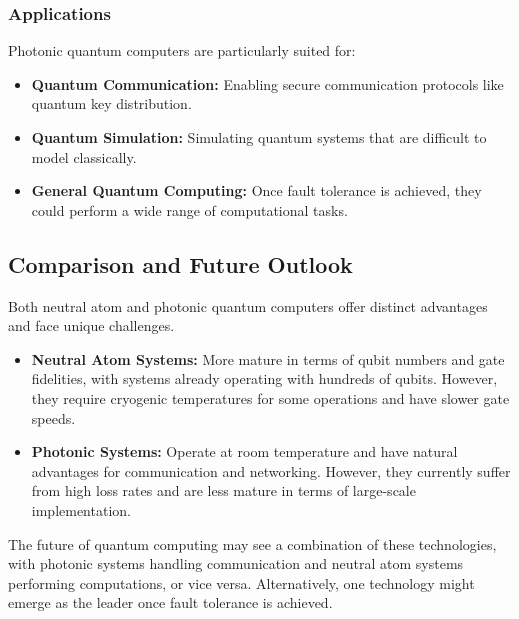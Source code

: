 \subsubsection*{Applications}

Photonic quantum computers are particularly suited for:

\begin{itemize}
  \item \textbf{Quantum Communication:} Enabling secure communication
    protocols like quantum key distribution.
  \item \textbf{Quantum Simulation:} Simulating quantum systems that are
    difficult to model classically.
  \item \textbf{General Quantum Computing:} Once fault tolerance is achieved,
    they could perform a wide range of computational tasks.
\end{itemize}



\subsection*{Comparison and Future Outlook}

Both neutral atom and photonic quantum computers offer distinct advantages
and face unique challenges.

\begin{itemize}
  \item \textbf{Neutral Atom Systems:} More mature in terms of qubit numbers
    and gate fidelities, with systems already operating with hundreds of
    qubits. However, they require cryogenic temperatures for some operations
    and have slower gate speeds.
  \item \textbf{Photonic Systems:} Operate at room temperature and have
    natural advantages for communication and networking. However, they
    currently suffer from high loss rates and are less mature in terms of
    large-scale implementation.
\end{itemize}

The future of quantum computing may see a combination of these technologies,
with photonic systems handling communication and neutral atom systems
performing computations, or vice versa. Alternatively, one technology might
emerge as the leader once fault tolerance is achieved.

